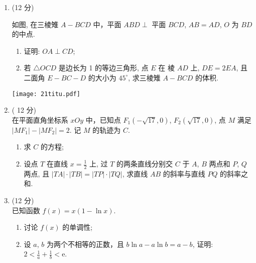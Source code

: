 \documentclass[11pt,space]{ctexart} %
\begin{document}
\begin{enumerate}[itemsep=0.5em,topsep=5pt,resume]
\item  (12 分)\\
\begin{minipage}[h][20ex][t]{.25\textwidth}
如图, 在三棱雉 $ A-B C D $ 中，平面 $ A B D \perp $ 平面
 $B C D$, $A B=A D$, $O $ 为  $B D$  的中点.

 \begin{enumerate}[itemsep=-0.3em,label={(\arabic*)},topsep=0pt,labelsep=.5em,leftmargin=3em]
	\item 证明:  $O A \perp C D  $;
	\item 若  $\triangle O C D $ 是边长为 1 的等边三角形, 点 $ E $ 在
	棱  $A D  $ 上,  $D E=2 E A $, 且二面角 $ E-B C-D $ 的大小为
	 $45^{\circ} $, 求三棱雉 $ A-B C D $ 的体积.
\end{enumerate}\end{minipage}
	\begin{minipage}[h][30ex][t]{.25\textwidth}
		\texttt{[image: 21titu.pdf]}
	\end{minipage}\vspace{3em}
\newpage
\item ( 12 分) \\
在平面直角坐标系 $ x O y $ 中，已知点 $ F_{1}(-\sqrt{17}, 0)$, $F_{2}(\sqrt{17}, 0)$,  点 $ M $ 满足
$ \left|M F_{1}\right|-\left|M F_{2}\right|=2 $.  记 $ M$  的轨迹为  $C$.
\begin{enumerate}[itemsep=-0.3em,label={(\arabic*)},topsep=0pt,labelsep=.5em,leftmargin=3em]
	\item 求 $ C$  的方程;
	\item 设点 $ T$  在直线 $ x=\frac{1}{2} $ 上, 过 $ T $ 的两条直线分别交 $ C$  于  $A$, $B $ 两点和 $ P$, $Q $ 两点,
	且  $|T A| \cdot|T B|=|T P| \cdot|T Q| $, 求直线  $A B $ 的斜率与直线 $ P Q $ 的斜率之和.
\end{enumerate}


\item (12 分)\\
已知函数 $ f(x)=x(1-\ln x) $.

\begin{enumerate}[itemsep=-0.3em,label={(\arabic*)},topsep=0pt,labelsep=.5em,leftmargin=3em]
	\item 讨论 $ f(x) $ 的单调性;
	\item 设 $ a$, $b $ 为两个不相等的正数，且 $ b \ln a-a \ln b=a-b $, 证明: $ 2<\frac{1}{a}+\frac{1}{b}<\mathrm{e} $.
\end{enumerate}

\end{enumerate}




\clearpage	
	
\end{document}
